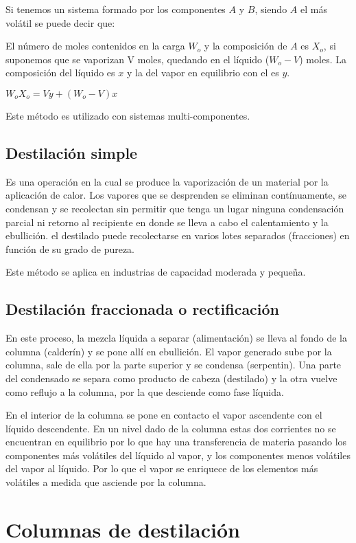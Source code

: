 \documentclass[11pt,openany]{book}
\begin{document}
Si tenemos un sistema formado por los componentes $A$ y $B$, siendo $A$ el más volátil se puede decir que:

El número de moles contenidos en la carga $W_o$ y la composición de $A$ es $X_o$, si suponemos que se 
vaporizan V moles, quedando en el líquido ($W_o - V$) moles. La composición del líquido es $x$ y la del 
vapor en equilibrio con el es $y$.

$W_o X_o = V y +(W_o -V) x$


Este método es utilizado con sistemas multi-componentes.

\subsection {Destilación simple}

Es una operación en la cual se produce la vaporización de un material por la aplicación de calor. Los 
vapores que se desprenden se eliminan contínuamente, se condensan y se recolectan sin permitir 
que tenga un lugar ninguna condensación parcial ni retorno al recipiente en donde se lleva a cabo 
el calentamiento y la ebullición. el destilado puede recolectarse en varios lotes separados
 (fracciones) en función de su grado de pureza.

 Este método se aplica en industrias de capacidad moderada y pequeña.

 \subsection{Destilación fraccionada o rectificación}

En este proceso, la mezcla líquida a separar (alimentación) se lleva al fondo de la columna (calderín) y 
se pone allí en ebullición. El vapor generado sube por la columna, sale de ella por la parte superior y 
se condensa (serpentin). Una parte del condensado se separa como producto de cabeza (destilado) y la otra 
vuelve como reflujo a la columna, por la que desciende como fase líquida.

En el interior de la columna se pone en contacto el vapor ascendente con el líquido descendente. 
En un nivel dado de la columna estas dos corrientes no se encuentran en equilibrio por lo que hay 
una transferencia de materia pasando los componentes más volátiles del líquido al vapor, y los 
componentes menos volátiles del vapor al líquido. Por lo que el vapor se enriquece de los 
elementos más volátiles a medida que asciende por la columna.

\section {Columnas de destilación}
\end{document}
